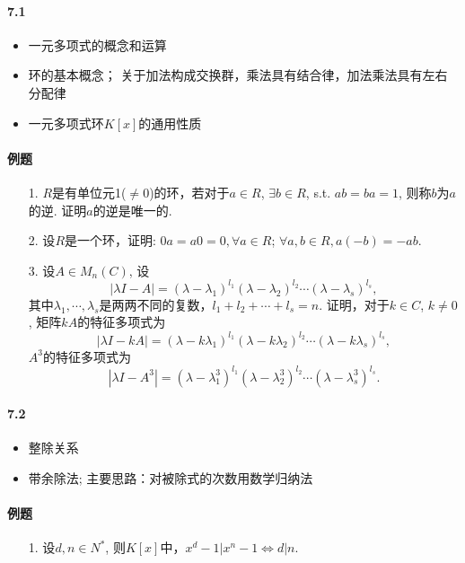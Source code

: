 \paragraph{7.1}
\begin{itemize}
  \item 一元多项式的概念和运算
  \item 环的基本概念； 关于加法构成交换群，乘法具有结合律，加法乘法具有左右分配律
  \item 一元多项式环$K[x]$的通用性质
\end{itemize}

\paragraph{例题}
\begin{itemize}
  \item[1.] $R$是有单位元1($\ne 0$)的环，若对于$a\in R$, $\exists b \in R$, s.t.
$ab = ba = 1$, 则称$b$为$a$的逆. 证明$a$的逆是唯一的.
  \item[2.] 设$R$是一个环，证明: $0a = a0 = 0, \forall a\in R$;
  $\forall a, b \in R, a(-b)=-ab$.  
  \item[3.] 设$A\in M_n(C)$, 设
  $$|\lambda I - A| = (\lambda - \lambda_1)^{l_1}(\lambda - \lambda_2)^{l_2}\cdots(\lambda - \lambda_s)^{l_s},$$
  其中$\lambda_1,\cdots,\lambda_s$是两两不同的复数，$l_1 + l_2 + \cdots + l_s = n$.
  证明，对于$k \in C$, $k \ne 0$, 矩阵$kA$的特征多项式为
  $$|\lambda I - kA| = (\lambda - k\lambda_1)^{l_1}(\lambda - k\lambda_2)^{l_2}\cdots(\lambda - k\lambda_s)^{l_s},$$
  $A^3$的特征多项式为
  $$|\lambda I - A^3| = (\lambda - \lambda_1^3)^{l_1}(\lambda - \lambda_2^3)^{l_2}\cdots(\lambda - \lambda_s^3)^{l_s}.$$
\end{itemize}

\vspace{0.5cm}
\paragraph{7.2}
\begin{itemize}
  \item 整除关系
  \item 带余除法; 主要思路：对被除式的次数用数学归纳法
\end{itemize}
\paragraph{例题}
\begin{itemize}
  \item[1.] 设$d,n\in N^*$, 则$K[x]$中，$x^d-1|x^n-1 \Leftrightarrow d|n$.
\end{itemize}

